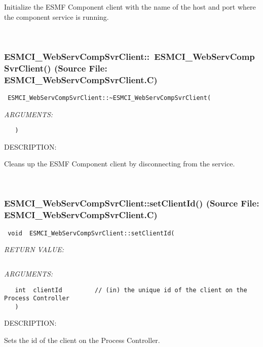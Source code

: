       Initialize the ESMF Component client with the name of the host and port
      where the component service is running.
   
 
\mbox{}\hrulefill\
 
\subsubsection{ESMCI\_WebServCompSvrClient::~ESMCI\_WebServCompSvrClient() (Source File: ESMCI\_WebServCompSvrClient.C)}


  
\begin{verbatim} ESMCI_WebServCompSvrClient::~ESMCI_WebServCompSvrClient(\end{verbatim}{\em ARGUMENTS:}
\begin{verbatim}   )\end{verbatim}
{\sf DESCRIPTION:\\ }


      Cleans up the ESMF Component client by disconnecting from the service.
   
 
\mbox{}\hrulefill\
 
\subsubsection{ESMCI\_WebServCompSvrClient::setClientId() (Source File: ESMCI\_WebServCompSvrClient.C)}


  
\begin{verbatim} void  ESMCI_WebServCompSvrClient::setClientId(\end{verbatim}{\em RETURN VALUE:}
\begin{verbatim} \end{verbatim}{\em ARGUMENTS:}
\begin{verbatim}   int  clientId         // (in) the unique id of the client on the Process Controller
   )\end{verbatim}
{\sf DESCRIPTION:\\ }


      Sets the id of the client on the Process Controller.
   
 
